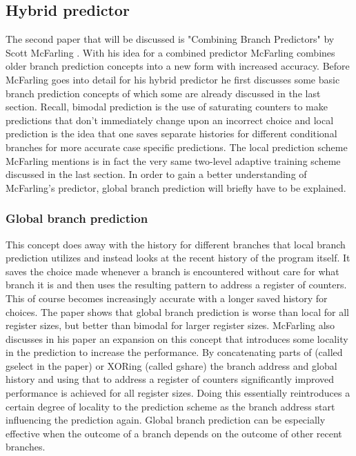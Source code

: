 \subsection{Hybrid predictor}
The second paper that will be discussed is "Combining Branch Predictors" by Scott McFarling \cite{hybrid}.
With his idea for a combined predictor McFarling combines older branch prediction concepts into a new form with increased accuracy.
Before McFarling goes into detail for his hybrid predictor he first discusses some basic branch prediction concepts of which some are already discussed in the last section.
Recall, bimodal prediction is the use of saturating counters to make predictions that don't immediately change upon an incorrect choice and local prediction is the idea that one saves separate histories for different conditional branches for more accurate case specific predictions.
The local prediction scheme McFarling mentions is in fact the very same two-level adaptive training scheme discussed in the last section.
In order to gain a better understanding of McFarling's predictor, global branch prediction will briefly have to be explained.
\subsubsection{Global branch prediction}
This concept does away with the history for different branches that local branch prediction utilizes and instead looks at the recent history of the program itself.
It saves the choice made whenever a branch is encountered without care for what branch it is and then uses the resulting pattern to address a register of counters.
This of course becomes increasingly accurate with a longer saved history for choices.
The paper shows that global branch prediction is worse than local for all register sizes, but better than bimodal for larger register sizes.
McFarling also discusses in his paper an expansion on this concept that introduces some locality in the prediction to increase the performance.
By concatenating parts of (called gselect in the paper) or XORing (called gshare) the branch address and global history and using that to address a register of counters significantly improved performance is achieved for all register sizes.
Doing this essentially reintroduces a certain degree of locality to the prediction scheme as the branch address start influencing the prediction again.
Global branch prediction can be especially effective when the outcome of a branch depends on the outcome of other recent branches.
